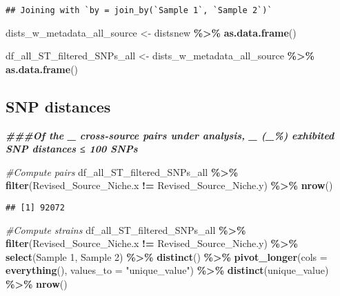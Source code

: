 \documentclass[
]{article}
\newenvironment{Shaded}{\begin{snugshade}}{\end{snugshade}}
\newcommand{\AttributeTok}[1]{\textcolor[rgb]{0.13,0.29,0.53}{#1}}
\newcommand{\CommentTok}[1]{\textcolor[rgb]{0.56,0.35,0.01}{\textit{#1}}}
\newcommand{\DocumentationTok}[1]{\textcolor[rgb]{0.56,0.35,0.01}{\textbf{\textit{#1}}}}
\newcommand{\FunctionTok}[1]{\textcolor[rgb]{0.13,0.29,0.53}{\textbf{#1}}}
\newcommand{\NormalTok}[1]{#1}
\newcommand{\OtherTok}[1]{\textcolor[rgb]{0.56,0.35,0.01}{#1}}
\newcommand{\SpecialCharTok}[1]{\textcolor[rgb]{0.81,0.36,0.00}{\textbf{#1}}}
\newcommand{\StringTok}[1]{\textcolor[rgb]{0.31,0.60,0.02}{#1}}
\begin{document}
\begin{verbatim}
## Joining with `by = join_by(`Sample 1`, `Sample 2`)`
\end{verbatim}

\begin{Shaded}
\begin{Highlighting}[]
\NormalTok{dists\_w\_metadata\_all\_source }\OtherTok{\textless{}{-}}\NormalTok{ distsnew }\SpecialCharTok{\%\textgreater{}\%} \FunctionTok{as.data.frame}\NormalTok{() }

\NormalTok{df\_all\_ST\_filtered\_SNPs\_all }\OtherTok{\textless{}{-}}\NormalTok{ dists\_w\_metadata\_all\_source }\SpecialCharTok{\%\textgreater{}\%} \FunctionTok{as.data.frame}\NormalTok{() }
\end{Highlighting}
\end{Shaded}

\hypertarget{snp-distances}{%
\subsection{SNP distances}\label{snp-distances}}

\begin{Shaded}
\begin{Highlighting}[]
\DocumentationTok{\#\#\#Of the \_ cross{-}source pairs under analysis, \_ (\_\%) exhibited SNP distances ≤ 100 SNPs}

\CommentTok{\#Compute pairs}
\NormalTok{df\_all\_ST\_filtered\_SNPs\_all }\SpecialCharTok{\%\textgreater{}\%} \FunctionTok{filter}\NormalTok{(Revised\_Source\_Niche.x }\SpecialCharTok{!=}\NormalTok{ Revised\_Source\_Niche.y) }\SpecialCharTok{\%\textgreater{}\%} \FunctionTok{nrow}\NormalTok{()}
\end{Highlighting}
\end{Shaded}

\begin{verbatim}
## [1] 92072
\end{verbatim}

\begin{Shaded}
\begin{Highlighting}[]
\CommentTok{\#Compute strains}
\NormalTok{df\_all\_ST\_filtered\_SNPs\_all }\SpecialCharTok{\%\textgreater{}\%} \FunctionTok{filter}\NormalTok{(Revised\_Source\_Niche.x }\SpecialCharTok{!=}\NormalTok{ Revised\_Source\_Niche.y) }\SpecialCharTok{\%\textgreater{}\%}
  \FunctionTok{select}\NormalTok{(}\StringTok{\textasciigrave{}}\AttributeTok{Sample 1}\StringTok{\textasciigrave{}}\NormalTok{, }\StringTok{\textasciigrave{}}\AttributeTok{Sample 2}\StringTok{\textasciigrave{}}\NormalTok{) }\SpecialCharTok{\%\textgreater{}\%}
  \FunctionTok{distinct}\NormalTok{() }\SpecialCharTok{\%\textgreater{}\%}
  \FunctionTok{pivot\_longer}\NormalTok{(}\AttributeTok{cols =} \FunctionTok{everything}\NormalTok{(), }\AttributeTok{values\_to =} \StringTok{"unique\_value"}\NormalTok{) }\SpecialCharTok{\%\textgreater{}\%}
  \FunctionTok{distinct}\NormalTok{(unique\_value) }\SpecialCharTok{\%\textgreater{}\%} \FunctionTok{nrow}\NormalTok{()}
\end{Highlighting}
\end{Shaded}
\end{document}
